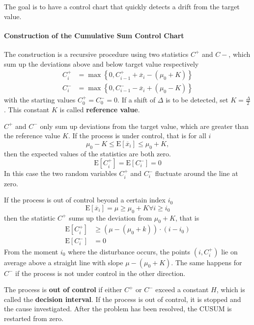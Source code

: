 \documentclass[11pt]{article}
\theoremstyle{definition}
\newcommand*\samplemean[1]{\overline{#1}}
\newcommand*\ev[1]{\mathrel{\text{E}\left[#1\right]}}
\begin{document}
The goal is to have a control chart that quickly detects a drift from the target value.

\paragraph{Construction of the Cumulative Sum Control Chart} The construction is a recursive procedure using two statistics $C^+$ and $C-$, which sum up the deviations above and below target value respectively
\begin{align*}
	C_i^+ &= \max\left\{0, C_{i-1}^+ + \samplemean{x}_i - (\mu_0 + K)\right\}\\
	C_i^- &= \max\left\{0, C_{i-1}^- - \samplemean{x}_i + (\mu_0 - K)\right\}
\end{align*}
with the starting values $C_0^+ = C_0^- = 0$. If a shift of $\Delta$ is to be detected, set $K=\frac{\Delta}{2}$. This constant $K$ is called \textbf{reference value}.

$C^+$ and $C^-$ only sum up deviations from the target value, which are greater than the reference value $K$. If the process is under control, that is for all $i$
\begin{equation*}
	\mu_0 - K \leq \ev{\samplemean{x}_i}\leq\mu_0+K,
\end{equation*}
then the expected values of the statistics are both zero.
\begin{equation*}
	\ev{C_i^+} = \ev{C_i^-} = 0
\end{equation*}
In this case the two random variables $C_i^+$ and $C_i^-$ fluctuate around the line at zero.

If the process is out of control beyond a certain index $i_0$
\begin{equation*}
	\ev{\samplemean{x}_i} = \mu \geq \mu_0 + K \forall i\geq i_0
\end{equation*}
then the statistic $C^+$ sums up the deviation from $\mu_0 + K$, that is 
\begin{align*}
	\ev{C_i^+} &\geq \left(\mu - (\mu_0 + k)\right)\cdot (i - i_0)\\
	\ev{C_i^-} &= 0
\end{align*}
From the moment $i_0$ where the disturbance occurs, the points $(i,C_i^+)$ lie on average above a straight line with slope $\mu - (\mu_0 + K)$. The same happens for $C^-$ if the process is not under control in the other direction.

The process is \textbf{out of control} if either $C^+$ or $C^-$ exceed a constant $H$, which is called the \textbf{decision interval}. If the process is out of control, it is stopped and the cause investigated. After the problem has been resolved, the CUSUM is restarted from zero.
\end{document}
